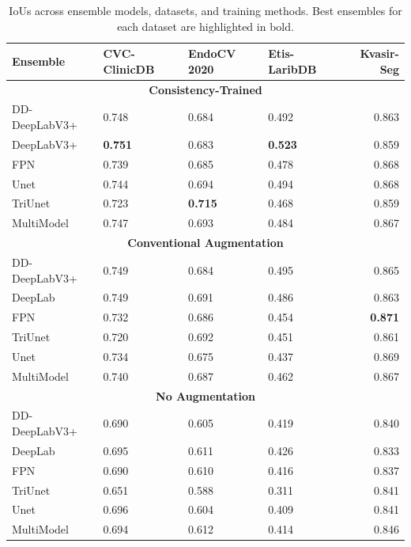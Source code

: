 \begin{table}[htb]
    \centering
    \begin{tabularx}{\linewidth}{lXXXr}
\toprule
Ensemble  & CVC-ClinicDB & EndoCV 2020 & Etis-LaribDB & Kvasir-Seg \\
\midrule
\multicolumn{5}{c}{\textbf{Consistency-Trained}}\\
\midrule
DD-DeepLabV3+   & 0.748 &0.684 &0.492 &0.863 \\
DeepLabV3+      & \textbf{0.751} & 0.683 & \textbf{0.523} &0.859 \\
FPN             & 0.739 & 0.685 &0.478 & 0.868 \\
Unet            & 0.744 & 0.694 &0.494 & 0.868 \\
TriUnet         & 0.723 & \textbf{0.715} & 0.468 & 0.859 \\
MultiModel      & 0.747 & 0.693 &0.484 &0.867 \\
\midrule
\multicolumn{5}{c}{\textbf{Conventional Augmentation}}\\
\midrule
DD-DeepLabV3+   & 0.749 & 0.684 & 0.495 & 0.865 \\
DeepLab         & 0.749 & 0.691 & 0.486 & 0.863 \\
FPN             & 0.732 & 0.686 & 0.454 & \textbf{0.871} \\
TriUnet         & 0.720 & 0.692 & 0.451 & 0.861 \\
Unet            & 0.734 & 0.675 & 0.437 & 0.869 \\
MultiModel      & 0.740 & 0.687 & 0.462 & 0.867 \\
\midrule
\multicolumn{5}{c}{\textbf{No Augmentation}}\\
\midrule
DD-DeepLabV3+  & 0.690 & 0.605 & 0.419 & 0.840 \\ 
DeepLab        & 0.695 & 0.611 & 0.426 & 0.833 \\ 
FPN            & 0.690 & 0.610 & 0.416 & 0.837 \\ 
TriUnet        & 0.651 & 0.588 & 0.311 & 0.841 \\ 
Unet           & 0.696 & 0.604 & 0.409 & 0.841 \\
MultiModel     & 0.694 & 0.612 & 0.414 & 0.846 \\
\bottomrule
\end{tabularx}
    \caption[IoUs across ensemble models and datasets. ]{IoUs across ensemble models, datasets, and training methods. Best ensembles for each dataset are highlighted in bold.}
    \label{tab:ensembles}
\end{table}

